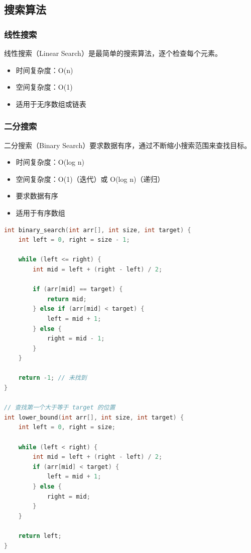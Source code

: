 \subsection{搜索算法}

\subsubsection{线性搜索}

线性搜索（Linear Search）是最简单的搜索算法，逐个检查每个元素。

\begin{itemize}
  \item 时间复杂度：O(n)
  \item 空间复杂度：O(1)
  \item 适用于无序数组或链表
\end{itemize}

\subsubsection{二分搜索}

二分搜索（Binary Search）要求数据有序，通过不断缩小搜索范围来查找目标。

\begin{itemize}
  \item 时间复杂度：O(log n)
  \item 空间复杂度：O(1)（迭代）或 O(log n)（递归）
  \item 要求数据有序
  \item 适用于有序数组
\end{itemize}

\begin{lstlisting}[language=C, caption={二分搜索实现}]
int binary_search(int arr[], int size, int target) {
    int left = 0, right = size - 1;

    while (left <= right) {
        int mid = left + (right - left) / 2;

        if (arr[mid] == target) {
            return mid;
        } else if (arr[mid] < target) {
            left = mid + 1;
        } else {
            right = mid - 1;
        }
    }

    return -1; // 未找到
}

// 查找第一个大于等于 target 的位置
int lower_bound(int arr[], int size, int target) {
    int left = 0, right = size;

    while (left < right) {
        int mid = left + (right - left) / 2;
        if (arr[mid] < target) {
            left = mid + 1;
        } else {
            right = mid;
        }
    }

    return left;
}
\end{lstlisting}

